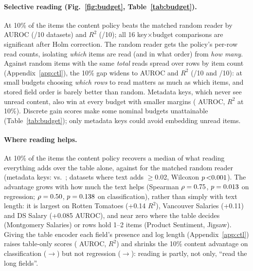\documentclass{article}
\begin{document}
\paragraph{Selective reading (Fig.~\ref{fig:budget}, Table~\ref{tab:budget}).}
At 10\% of the items the content policy beats the matched random reader by \gainContentTenClsDelta{} AUROC (\gainContentTenClsWins/10 datasets) and \gainContentTenRegDelta{} $R^2$ (\gainContentTenRegWins/10); all 16 key$\times$budget comparisons are significant after Holm correction.
The random reader gets the policy's per-row read counts, isolating \emph{which} items are read (and in what order) from \emph{how many}.
Against random items with the same \emph{total} reads spread over rows by item count (Appendix~\ref{app:ctl}), the 10\% gap widens to \ctlTotalContentTenClsDelta{} AUROC and \ctlTotalContentTenRegDelta{} $R^2$ (\ctlTotalContentTenClsWins/10 and \ctlTotalContentTenRegWins/10): at small budgets choosing \emph{which rows} to read matters as much as which items, and stored field order is barely better than random.
Metadata keys, which never see unread content, also win at every budget with smaller margins (\gainMetaTenClsDelta{} AUROC, \gainMetaTenRegDelta{} $R^2$ at 10\%).
Discrete gain scores make some nominal budgets unattainable (Table~\ref{tab:budget}); only metadata keys could avoid embedding unread items.

\paragraph{Where reading helps.}
At 10\% of the items the content policy recovers a median \recContentTen{} of what reading everything adds over the table alone, against \recRandomContentTen{} for the matched random reader (metadata keys: \recMetaTen{} vs.\ \recRandomMetaTen; \recN{} datasets where text adds $\ge$0.02, Wilcoxon $p\,\recMaxP$).
The advantage grows with how much the text helps (Spearman $\rho=0.75$, $p=0.013$ on regression; $\rho=0.50$, $p=0.138$ on classification), rather than simply with text length: it is largest on Rotten Tomatoes (+0.14 $R^2$), Vancouver Salaries (+0.11) and DS Salary (+0.085 AUROC), and near zero where the table decides (Montgomery Salaries) or rows hold 1--2 items (Product Sentiment, Jigsaw).
Giving the table encoder each field's presence and log length (Appendix~\ref{app:ctl}) raises table-only scores (\fmTableClsDelta{} AUROC, \fmTableRegDelta{} $R^2$) and shrinks the 10\% content advantage on classification (\fmAdvContentTenClsWithout{}$\to$\fmAdvContentTenClsWith) but not regression (\fmAdvContentTenRegWithout{}$\to$\fmAdvContentTenRegWith): reading is partly, not only, ``read the long fields''.
\end{document}
